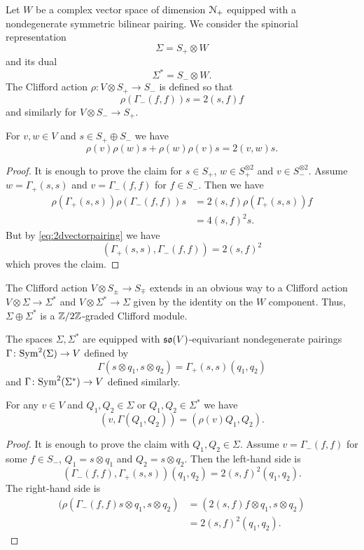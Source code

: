 \documentclass[10pt, oneside]{article}
\begin{document}
Let $W$ be a complex vector space of dimension $\mathcal N_+$ equipped with a nondegenerate symmetric bilinear pairing. We consider the spinorial representation
\[\Sigma = S_+\otimes W\]
and its dual
\[\Sigma^* = S_-\otimes W.\]
The Clifford action $\rho \colon V\otimes S_+\rightarrow S_-$ is defined so that
\[\rho(\Gamma_-(f, f)) s = 2(s, f) f\]
and similarly for $V\otimes S_-\rightarrow S_+$.

\begin{prop}
For $v,w\in V$ and $s\in S_+\oplus S_-$ we have
\[\rho(v)\rho(w)s + \rho(w)\rho(v) s = 2(v, w) s.\]
\end{prop}
\begin{proof}
It is enough to prove the claim for $s\in S_+$, $w\in S_+^{\otimes 2}$ and $v\in S_-^{\otimes 2}$. Assume $w=\Gamma_+(s, s)$ and $v = \Gamma_-(f, f)$ for $f\in S_-$. Then we have
\begin{align*}
\rho(\Gamma_+(s, s)) \rho(\Gamma_-(f, f)) s &= 2(s, f) \rho(\Gamma_+(s, s)) f \\
&= 4(s, f)^2 s.
\end{align*}
But by \eqref{eq:2dvectorpairing} we have
\[(\Gamma_+(s, s), \Gamma_-(f, f)) = 2(s, f)^2\]
which proves the claim.
\end{proof}

The Clifford action $V\otimes S_{\pm}\rightarrow S_{\mp}$ extends in an obvious way to a Clifford action $V\otimes \Sigma\rightarrow \Sigma^*$ and $V\otimes \Sigma^*\rightarrow \Sigma$ given by the identity on the $W$ component. Thus, $\Sigma\oplus \Sigma^*$ is a $\mathbb Z/2\mathbb Z$-graded Clifford module.

The spaces $\Sigma, \Sigma^*$ are equipped with $\mathfrak{so}(V)$-equivariant nondegenerate pairings $\Gamma\colon {\rm Sym}^2(\Sigma)\rightarrow V$ defined by
\[\Gamma(s\otimes q_1, s\otimes q_2) = \Gamma_+(s, s) (q_1, q_2)\]
and $\Gamma\colon {\rm Sym}^2(\Sigma^*)\rightarrow V$ defined similarly.

\begin{prop}
For any $v\in V$ and $Q_1, Q_2\in\Sigma$ or $Q_1, Q_2\in\Sigma^*$ we have
\[(v, \Gamma(Q_1, Q_2)) = (\rho(v) Q_1, Q_2).\]
\end{prop}
\begin{proof}
It is enough to prove the claim with $Q_1, Q_2\in\Sigma$. Assume $v = \Gamma_-(f, f)$ for some $f\in S_-$, $Q_1 = s\otimes q_1$ and $Q_2 = s\otimes q_2$. Then the left-hand side is
\[(\Gamma_-(f, f), \Gamma_+(s, s)) (q_1, q_2) = 2(s, f)^2 (q_1, q_2).\]
The right-hand side is
\begin{align*}
(\rho(\Gamma_-(f, f) s\otimes q_1, s\otimes q_2) &= (2(s, f) f\otimes q_1, s\otimes q_2) \\
&= 2(s, f)^2 (q_1, q_2).
\end{align*}
\end{proof}
\end{document}
